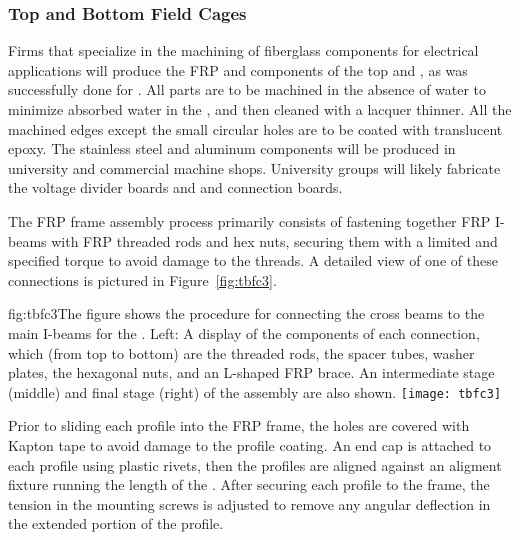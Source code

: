 
\subsubsection{Top and Bottom Field Cages}

Firms that specialize in the machining of fiberglass components for electrical applications will produce the FRP and \frfour components of the top and , as was successfully done for . All parts are to be machined in the absence of water to minimize absorbed water in the , and then cleaned with a lacquer thinner. 
All the machined edges except the small circular holes are to be coated with translucent epoxy. The stainless steel and aluminum components will be produced in university and commercial machine shops. University groups will likely fabricate the voltage divider boards and  and  connection boards.

The FRP frame assembly process primarily consists of fastening together FRP I-beams with FRP threaded rods and hex nuts,  securing them with a limited and specified torque to avoid damage to the threads. A detailed view of one of these connections is pictured in Figure~\ref{fig:tbfc3}.

\begin{dunefigure}{fig:tbfc3}{The figure shows the procedure for connecting the cross beams to the main I-beams for the . Left: A display of the components of each connection, which (from top to bottom) are the threaded rods, the spacer tubes, washer plates, the hexagonal nuts, and an L-shaped FRP brace. An intermediate stage (middle) and final stage (right) of the assembly are also shown.}
\texttt{[image: tbfc3]}
\end{dunefigure}

Prior to sliding each profile into the FRP frame, the holes %
are covered with Kapton tape to avoid damage to the profile coating. An end cap is attached to each profile using plastic rivets, then the profiles are aligned against an aligment fixture running the length of the . After securing each profile to the frame, the tension in the mounting screws is adjusted to remove any angular deflection in the extended portion of the profile.

